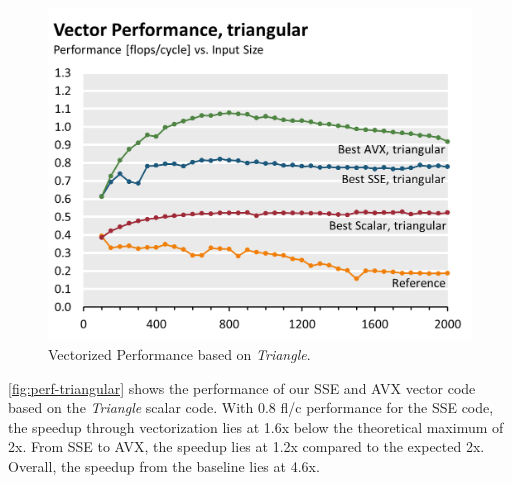\begin{figure}\centering
  \includegraphics[width=\linewidth]{plot_data/triangular_vector_performance.png}
  \caption{Vectorized Performance based on \emph{Triangle}.}
  \label{fig:perf-triangular}
\end{figure}
\autoref{fig:perf-triangular} shows the performance of our SSE and AVX
vector code based on the \emph{Triangle} scalar code. With 0.8 fl/c
performance for the SSE code, the speedup through vectorization lies at
1.6x below the theoretical maximum of 2x. From SSE to AVX, the speedup lies
at 1.2x compared to the expected 2x. Overall, the speedup from the baseline
lies at 4.6x.

